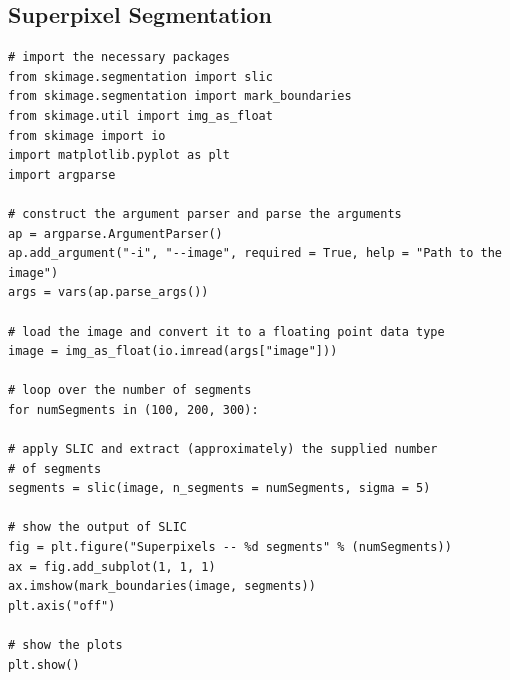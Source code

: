 \subsection{Superpixel Segmentation}
\begin{verbatim}
# import the necessary packages
from skimage.segmentation import slic
from skimage.segmentation import mark_boundaries
from skimage.util import img_as_float
from skimage import io
import matplotlib.pyplot as plt
import argparse

# construct the argument parser and parse the arguments
ap = argparse.ArgumentParser()
ap.add_argument("-i", "--image", required = True, help = "Path to the image")
args = vars(ap.parse_args())

# load the image and convert it to a floating point data type
image = img_as_float(io.imread(args["image"]))

# loop over the number of segments
for numSegments in (100, 200, 300):

# apply SLIC and extract (approximately) the supplied number
# of segments
segments = slic(image, n_segments = numSegments, sigma = 5)

# show the output of SLIC
fig = plt.figure("Superpixels -- %d segments" % (numSegments))
ax = fig.add_subplot(1, 1, 1)
ax.imshow(mark_boundaries(image, segments))
plt.axis("off")

# show the plots
plt.show()
\end{verbatim}
